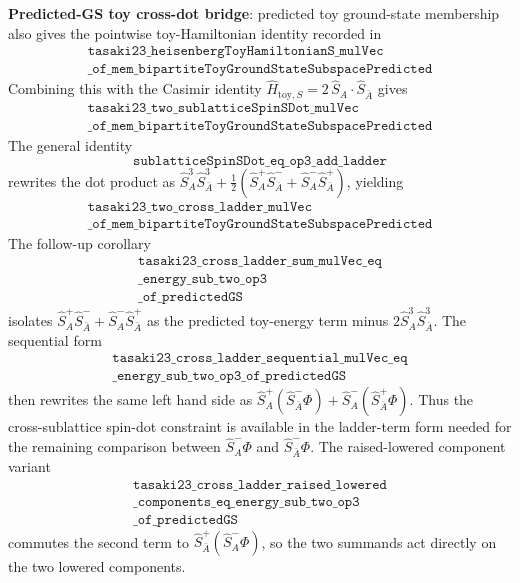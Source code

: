 \documentclass[a4paper,11pt]{article}
\begin{document}
\textbf{Predicted-GS toy cross-dot bridge}: predicted toy ground-state
membership also gives the pointwise toy-Hamiltonian identity recorded in
\[
\begin{gathered}
\texttt{tasaki23\_heisenbergToyHamiltonianS\_mulVec}\\
\texttt{\_of\_mem\_bipartiteToyGroundStateSubspacePredicted}
\end{gathered}
\]
Combining this with the Casimir identity
\(\hat H_{\mathrm{toy},S}=2\,\hat S_A\cdot \hat S_{\bar A}\) gives
\[
\begin{gathered}
\texttt{tasaki23\_two\_sublatticeSpinSDot\_mulVec}\\
\texttt{\_of\_mem\_bipartiteToyGroundStateSubspacePredicted}
\end{gathered}
\]
The general identity
\[
\texttt{sublatticeSpinSDot\_eq\_op3\_add\_ladder}
\]
rewrites the dot product as
\(\hat S_A^3\hat S_{\bar A}^3+
\frac12(\hat S_A^+\hat S_{\bar A}^-+
\hat S_A^-\hat S_{\bar A}^+)\), yielding
\[
\begin{gathered}
\texttt{tasaki23\_two\_cross\_ladder\_mulVec}\\
\texttt{\_of\_mem\_bipartiteToyGroundStateSubspacePredicted}
\end{gathered}
\]
The follow-up corollary
\[
\begin{gathered}
\texttt{tasaki23\_cross\_ladder\_sum\_mulVec\_eq}\\
\texttt{\_energy\_sub\_two\_op3}\\
\texttt{\_of\_predictedGS}
\end{gathered}
\]
isolates
\(\hat S_A^+\hat S_{\bar A}^-+\hat S_A^-\hat S_{\bar A}^+\)
as the predicted toy-energy term minus
\(2\hat S_A^3\hat S_{\bar A}^3\).  The sequential form
\[
\begin{gathered}
\texttt{tasaki23\_cross\_ladder\_sequential\_mulVec\_eq}\\
\texttt{\_energy\_sub\_two\_op3\_of\_predictedGS}
\end{gathered}
\]
then rewrites the same left hand side as
\(\hat S_A^+(\hat S_{\bar A}^-\Phi)+
\hat S_A^-(\hat S_{\bar A}^+\Phi)\).  Thus the cross-sublattice
spin-dot constraint is available in the ladder-term form needed for the
remaining comparison between \(\hat S_A^-\Phi\) and
\(\hat S_{\bar A}^-\Phi\).  The raised-lowered component variant
\[
\begin{gathered}
\texttt{tasaki23\_cross\_ladder\_raised\_lowered}\\
\texttt{\_components\_eq\_energy\_sub\_two\_op3}\\
\texttt{\_of\_predictedGS}
\end{gathered}
\]
commutes the second term to
\(\hat S_{\bar A}^+(\hat S_A^-\Phi)\), so the two summands act directly
on the two lowered components.
\end{document}
